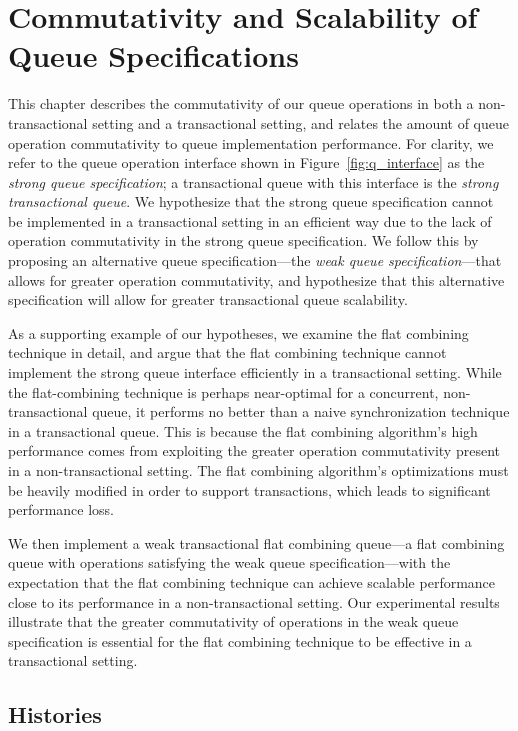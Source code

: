 \chapter{Commutativity and Scalability of Queue Specifications}
\label{commutativity}

This chapter describes the commutativity of our queue operations in both a non-transactional setting and a transactional setting, and relates the amount of queue operation commutativity to queue implementation performance. For clarity, we refer to the queue operation interface shown in Figure~\ref{fig:q_interface} as the \emph{strong queue specification}; a transactional queue with this interface is the \emph{strong transactional queue}. We hypothesize that the strong queue specification cannot be implemented in a transactional setting in an efficient way due to the lack of operation commutativity in the strong queue specification. 
We follow this by proposing an alternative queue specification---the \emph{weak queue specification}---that allows for greater operation commutativity, and hypothesize that this alternative specification will allow for greater transactional queue scalability.

As a supporting example of our hypotheses, we examine the flat combining technique in detail, and argue that the flat combining technique cannot implement the strong queue interface efficiently in a transactional setting. While the flat-combining technique is perhaps near-optimal for a concurrent, non-transactional queue, it performs no better than a naive synchronization technique in a transactional queue. This is because the flat combining algorithm's high performance comes from exploiting the greater operation commutativity present in a non-transactional setting. The flat combining algorithm's optimizations must be heavily modified in order to support transactions, which leads to significant performance loss. 

We then implement a weak transactional flat combining queue---a flat combining queue with operations satisfying the weak queue specification---with the expectation that the flat combining technique can achieve scalable performance close to its performance in a non-transactional setting. Our experimental results illustrate that the greater commutativity of operations in the weak queue specification is essential for the flat combining technique to be effective in a transactional setting.

\section{Histories}

